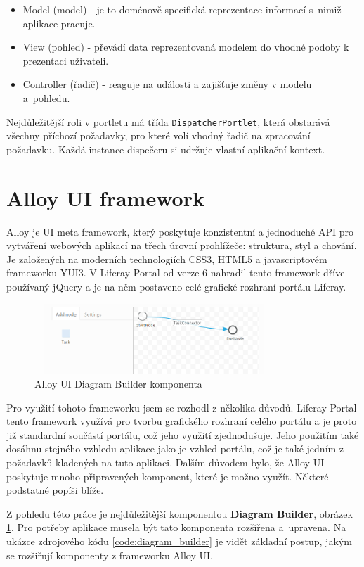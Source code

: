 \documentclass{fithesis}
\begin{document}
\begin{itemize}
\item Model (model) - je to doménově specifická reprezentace informací s~nimiž aplikace pracuje.
\item View (pohled) - převádí data reprezentovaná modelem do vhodné podoby  k prezentaci uživateli.
\item Controller (řadič) - reaguje na události a zajišťuje změny v modelu a~pohledu.
\end{itemize}

Nejdůležitější roli v portletu má třída \verb|DispatcherPortlet|, která obstarává všechny příchozí požadavky, pro které volí vhodný řadič na zpracování požadavku. Každá instance dispečeru si udržuje vlastní aplikační kontext.


\section{Alloy UI framework}
Alloy je UI meta framework, který poskytuje konzistentní a jednoduché API pro vytváření webových aplikací na třech úrovní prohlížeče: struktura, styl a chování. Je založených na moderních technologiích CSS3, HTML5 a javascriptovém frameworku YUI3. \cite{alloy} V Liferay Portal od verze 6 nahradil tento framework dříve používaný jQuery a je na něm postaveno celé grafické rozhraní portálu Liferay.

\begin{figure}[htp]
\centering
\includegraphics[width=340px, height=100px]{images/diagram_builder.png}
\caption{Alloy UI Diagram Builder komponenta}
\label{fig:diagram_builder}
\end{figure}

Pro využití tohoto frameworku jsem se rozhodl z několika důvodů. Liferay Portal tento framework využívá pro tvorbu grafického rozhraní celého portálu a je proto již standardní součástí portálu, což jeho využití zjednodušuje. Jeho použitím také dosáhnu stejného vzhledu aplikace jako je vzhled portálu, což je také jedním z požadavků kladených na tuto aplikaci. Dalším důvodem bylo, že Alloy UI poskytuje mnoho připravených komponent, které je možno využít. Některé podstatné popíši blíže. 

Z pohledu této práce je nejdůležitější komponentou \textbf{Diagram Builder}, obrázek  \ref{fig:diagram_builder}. Pro potřeby aplikace musela být tato komponenta rozšířena a~upravena. Na ukázce zdrojového kódu \ref{code:diagram_builder} je vidět základní postup, jakým se rozšiřují komponenty z frameworku Alloy UI.
\end{document}
